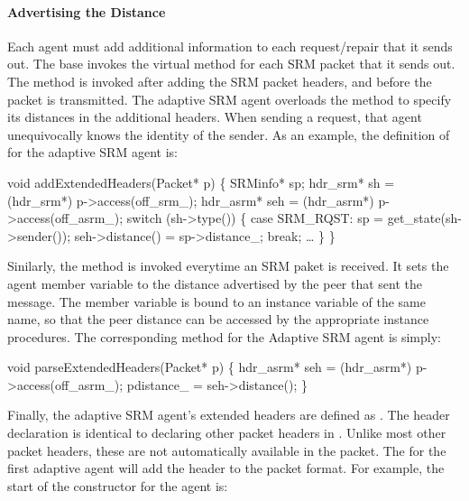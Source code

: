 {\paragraph{Advertising the Distance}
Each agent must add additional information to each request/repair
that it sends out.
The base 
invokes the virtual method
for each SRM packet that it sends out.
The method is invoked after adding the SRM packet headers, and
before the packet is transmitted.
The adaptive SRM agent overloads the method
to specify its distances in the additional headers.
When sending a request, that agent unequivocally knows the
identity of the sender.
As an example, the definition of
 for the adaptive SRM agent is:
\begin{program}
        void addExtendedHeaders(Packet* p) \{
                SRMinfo* sp;
                hdr_srm*  sh = (hdr_srm*) p->access(off_srm_);
                hdr_asrm* seh = (hdr_asrm*) p->access(off_asrm_);
                switch (sh->type()) \{
                case SRM_RQST:
                        sp = get_state(sh->sender());
                        seh->distance() = sp->distance_;
                        break;
                \ldots
                \}
        \}
\end{program}


Sinilarly, the method
is invoked everytime an SRM paket is received.
It sets the agent member variable 
to the distance advertised by the peer that sent the message.
The member variable is bound to an instance variable of the same name,
so that the peer distance can be accessed
by the appropriate instance procedures.
The corresponding  method for the
Adaptive SRM agent is simply:
\begin{program}
        void parseExtendedHeaders(Packet* p) \{
                hdr_asrm* seh = (hdr_asrm*) p->access(off_asrm_);
                pdistance_ = seh->distance();
        \}
\end{program}


Finally, the adaptive SRM agent's extended headers are defined as
.
The header declaration is identical to declaring other packet headers in \ns.
Unlike most other packet headers, 
these are not automatically available in the packet.
The
for the first adaptive agent
will add the header to the packet format.
For example, the start of the constructor for the
 agent is:
}
